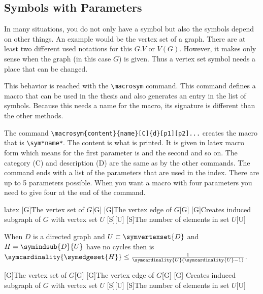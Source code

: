 \subsection{Symbols with Parameters}
In many situations, you do not only have a symbol but also the symbols depend
on other things. An example would be the vertex set of a graph. There are at
least two different used notations for this $G.V$ or $V(G)$.  However, it
makes only sense when the graph (in this case $G$) is given. Thus a vertex set
symbol needs a place that can be changed.

This behavior is reached with the \verb!\macrosym! command. This command
defines a macro that can be used in the thesis and also generates an entry in
the list of symbols. Because this needs a name for the macro, its signature is
different than the other methods.

The command \verb!\macrosym{content}{name}[C]{d}[p1][p2]...!
creates the macro that is \verb!\sym*name*!. The content is what is printed.
It is given in latex macro form which means for the first parameter is 
and the second  and so on. The category (C) and description (D) are the
same as by the other commands. The command ends with a list of the parameters
that are used in the index. There are up to 5 parameters possible. When you
want a macro with four parameters you need to give four at the end of the
command.

\begin{algorithm}
    \label{alg:symmac}
\begin{code}{latex}
[G]{The vertex set of $G$}[G]
[G]{The vertex edge of $G$}[G]
[G]{Creates induced subgraph of $G$
 with vertex set $U$ }[S][U]
[S]{The number of elements
in set $U$}[U]

When $D$ is a directed graph and $U\subset\symvertexset{D}$ and
$H=\symindsub{D}{U}$ have no cycles then is
$\symcardinality{\symedgeset{H}}\leq\frac{1}
{\symcardinality{U}(\symcardinality{U}-1)}$.
\end{code}
\end{algorithm}
[G]{The vertex set of $G$}[G]
[G]{The vertex edge of $G$}[G]
[G]{%
    Creates induced subgraph of $G$ with vertex set $U$ }[S][U]
[S]{The number of elements in set $U$}[U]

